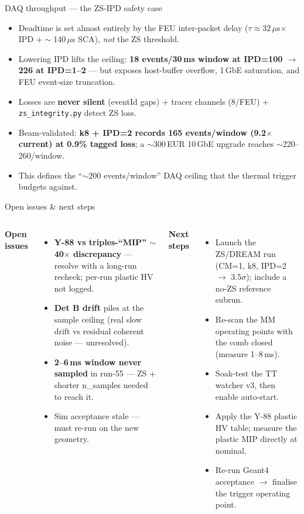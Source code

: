 \documentclass[aspectratio=169,10pt]{beamer}
\newcommand{\hl}[1]{{\color{TealD}\textbf{#1}}}
\begin{document}
\begin{frame}{DAQ throughput --- the ZS-IPD safety case}
\small
\begin{itemize}\setlength\itemsep{3pt}
  \item Deadtime is set almost entirely by the FEU inter-packet delay ($\tau\approx32\,\mu$s$\times$IPD $+\sim$140\,$\mu$s SCA), \emph{not} the ZS threshold.
  \item Lowering IPD lifts the ceiling: \hl{18 events/30\,ms window at IPD=100 $\to$ 226 at IPD=1--2} --- but exposes host-buffer overflow, 1\,GbE saturation, and FEU event-size truncation.
  \item Losses are \hl{never silent} (eventId gaps) + tracer channels (8/FEU) + \texttt{zs\_integrity.py} detect ZS loss.
  \item Beam-validated: \hl{k8 + IPD=2 records 165 events/window (9.2$\times$ current) at 0.9\% tagged loss}; a $\sim$300\,EUR 10\,GbE upgrade reaches $\sim$220--260/window.
  \item This defines the ``$\sim$200 events/window'' DAQ ceiling that the thermal trigger budgets against.
\end{itemize}
\end{frame}

\begin{frame}{Open issues \& next steps}
\small
\begin{columns}[T]
\textbf{\color{Amber}Open issues}
\begin{itemize}\setlength\itemsep{2pt}
  \item \hl{Y-88 vs triples-``MIP'' $\sim$40$\times$ discrepancy} --- resolve with a long-run recheck; per-run plastic HV not logged.
  \item \hl{Det B drift} piles at the sample ceiling (real slow drift vs residual coherent noise --- unresolved).
  \item \hl{2--6\,ms window never sampled} in run-55 --- ZS + shorter n\_samples needed to reach it.
  \item Sim acceptance stale --- must re-run on the new geometry.
\end{itemize}
\textbf{\color{TealD}Next steps}
\begin{itemize}\setlength\itemsep{2pt}
  \item Launch the ZS/DREAM run (CM=1, k8, IPD=2 $\to$ 3.5$\sigma$); include a no-ZS reference subrun.
  \item Re-scan the MM operating points with the comb closed (measure 1--8\,ms).
  \item Soak-test the TT watcher v3, then enable auto-start.
  \item Apply the Y-88 plastic HV table; measure the plastic MIP directly at nominal.
  \item Re-run Geant4 acceptance $\to$ finalise the trigger operating point.
\end{itemize}
\end{columns}
\end{frame}
\end{document}

